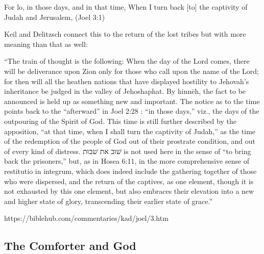 \documentclass[11pt]{article}
\begin{document}
For lo, in those days, and in that time, When I turn back [to] the captivity of Judah and Jerusalem, (Joel 3:1)

Keil and Delitzsch connect this to the return of the lost tribes but with more meaning than that as well:

“The train of thought is the following: When the day of the Lord comes, there will be deliverance upon Zion only for those who call upon the name of the Lord; for then will all the heathen nations that have displayed hostility to Jehovah’s inheritance be judged in the valley of Jehoshaphat. By hinnēh, the fact to be announced is held up as something new and important. The notice as to the time points back to the “afterward” in Joel 2:28 : “in those days,” viz., the days of the outpouring of the Spirit of God. This time is still further described by the apposition, “at that time, when I shall turn the captivity of Judah,” as the time of the redemption of the people of God out of their prostrate condition, and out of every kind of distress. שׁוּב את שׁבוּת is not used here in the sense of “to bring back the prisoners,” but, as in Hosea 6:11, in the more comprehensive sense of restitutio in integrum, which does indeed include the gathering together of those who were dispersed, and the return of the captives, as one element, though it is not exhausted by this one element, but also embraces their elevation into a new and higher state of glory, transcending their earlier state of grace.”

https://biblehub.com/commentaries/kad/joel/3.htm

\subsection{The Comforter and God} \label{the comforter and god}
\end{document}
